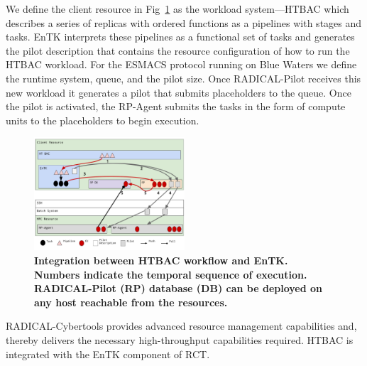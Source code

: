 We define the client resource in Fig~\ref{figure:ht-bac_rp} as the workload
system---HTBAC which describes a series of replicas with ordered functions as
a pipelines with stages and tasks. EnTK interprets these pipelines as a
functional set of tasks and generates the pilot description that contains the
resource configuration of how to run the HTBAC workload. For the ESMACS
protocol running on Blue Waters we define the runtime system, queue, and the
pilot size. Once RADICAL-Pilot receives this new workload it generates a
pilot that submits placeholders to the queue. Once the pilot is activated,
the RP-Agent submits the tasks in the form of compute units to the
placeholders to begin execution.


\begin{figure}
\centering
  \includegraphics[width=0.5\textwidth]{FIGURES/ht-bac-rp_integration.pdf}
  \caption{\bf Integration between HTBAC workflow and EnTK\@. Numbers
  indicate the temporal sequence of execution. RADICAL-Pilot (RP) database
  (DB) can be deployed on any host reachable from the
  resources.}
  \label{figure:ht-bac_rp}
\end{figure}


RADICAL-Cybertools provides advanced resource management capabilities and,
thereby delivers the necessary high-throughput capabilities required. HTBAC is
integrated with the EnTK component of RCT. 


